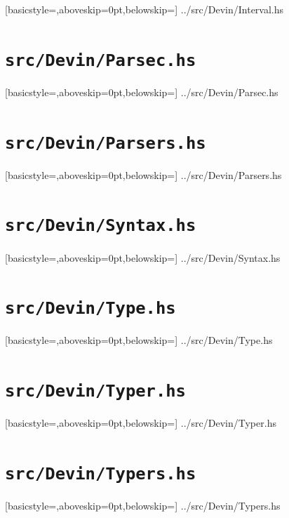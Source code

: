 \documentclass[UdineBachThesis,american,11pt]{PhdThesis}
\begin{document}
  
    [basicstyle=\ttfamily\footnotesize,aboveskip=0pt,belowskip=\baselineskip]
    {../src/Devin/Interval.hs}

  \section{\texttt{src/Devin/Parsec.hs}}

  
    [basicstyle=\ttfamily\footnotesize,aboveskip=0pt,belowskip=\baselineskip]
    {../src/Devin/Parsec.hs}

  \section{\texttt{src/Devin/Parsers.hs}}

  
    [basicstyle=\ttfamily\footnotesize,aboveskip=0pt,belowskip=\baselineskip]
    {../src/Devin/Parsers.hs}

  \section{\texttt{src/Devin/Syntax.hs}}

  
    [basicstyle=\ttfamily\footnotesize,aboveskip=0pt,belowskip=\baselineskip]
    {../src/Devin/Syntax.hs}

  \section{\texttt{src/Devin/Type.hs}}

  
    [basicstyle=\ttfamily\footnotesize,aboveskip=0pt,belowskip=\baselineskip]
    {../src/Devin/Type.hs}

  \section{\texttt{src/Devin/Typer.hs}}

  
    [basicstyle=\ttfamily\footnotesize,aboveskip=0pt,belowskip=\baselineskip]
    {../src/Devin/Typer.hs}

  \section{\texttt{src/Devin/Typers.hs}}

  
    [basicstyle=\ttfamily\footnotesize,aboveskip=0pt,belowskip=\baselineskip]
    {../src/Devin/Typers.hs}
\end{document}
